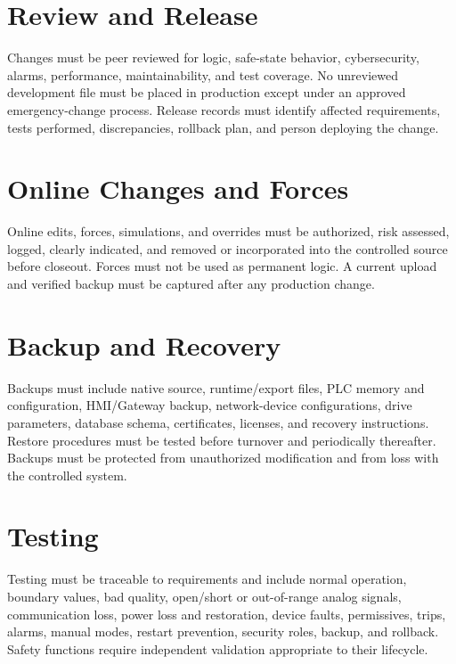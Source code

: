 \section{Review and Release}
Changes must be peer reviewed for logic, safe-state behavior, cybersecurity, alarms, performance, maintainability, and test coverage. No unreviewed development file must be placed in production except under an approved emergency-change process. Release records must identify affected requirements, tests performed, discrepancies, rollback plan, and person deploying the change.

\section{Online Changes and Forces}
Online edits, forces, simulations, and overrides must be authorized, risk assessed, logged, clearly indicated, and removed or incorporated into the controlled source before closeout. Forces must not be used as permanent logic. A current upload and verified backup must be captured after any production change.

\section{Backup and Recovery}
Backups must include native source, runtime/export files, PLC memory and configuration, HMI/Gateway backup, network-device configurations, drive parameters, database schema, certificates, licenses, and recovery instructions. Restore procedures must be tested before turnover and periodically thereafter. Backups must be protected from unauthorized modification and from loss with the controlled system.

\section{Testing}
Testing must be traceable to requirements and include normal operation, boundary values, bad quality, open/short or out-of-range analog signals, communication loss, power loss and restoration, device faults, permissives, trips, alarms, manual modes, restart prevention, security roles, backup, and rollback. Safety functions require independent validation appropriate to their lifecycle.
